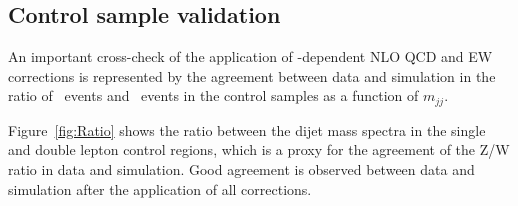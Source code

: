 \subsection{Control sample validation}

An important cross-check of the application of \pt-dependent NLO QCD and EW corrections
is represented by the agreement between data and simulation in the ratio of
\Zjets~events and \Wjets~events in the control samples as a function of $m_{jj}$.

Figure~\ref{fig:Ratio} shows the ratio between the dijet mass spectra in the single and double lepton control regions,
which is a proxy for the agreement of the Z/W ratio in data and simulation.
Good agreement is observed between data and simulation after the application of all corrections.

